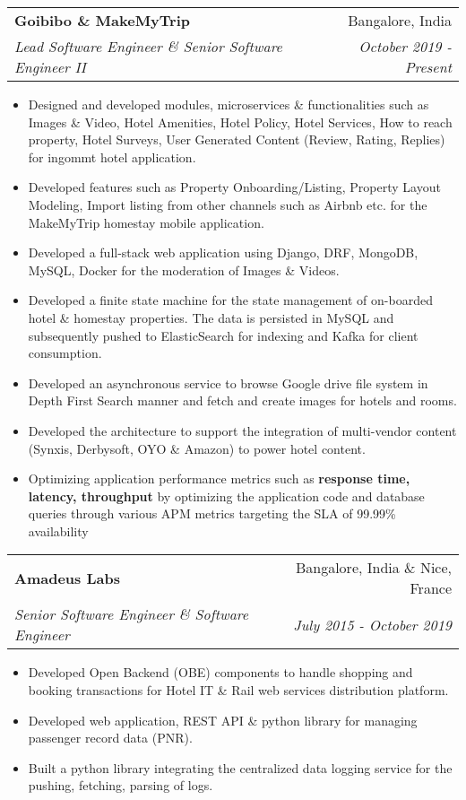 \documentclass[letterpaper,11pt]{article}
\makeatletter
\newcommand{\resumeItem}[1]{
  \item\small{
    {#1 \vspace{-2pt}}
  }
}
\newcommand{\resumeSubheading}[4]{
  \vspace{-2pt}\item
    \begin{tabular*}{0.97\textwidth}[t]{l@{\extracolsep{\fill}}r}
      \textbf{#1} & #2 \\
      \textit{\small#3} & \textit{\small #4} \\
    \end{tabular*}\vspace{-7pt}
}
\newcommand{\resumeSubSubheading}[2]{
    \item
    \begin{tabular*}{0.97\textwidth}{l@{\extracolsep{\fill}}r}
      \textit{\small#1} & \textit{\small #2} \\
    \end{tabular*}\vspace{-7pt}
}
\newcommand{\resumeSubHeadingListEnd}{\end{itemize}}
\newcommand{\resumeItemListStart}{\begin{itemize}}
\newcommand{\resumeItemListEnd}{\end{itemize}\vspace{-5pt}}
\makeatother
\begin{document}
\resumeSubheading
{Goibibo \& MakeMyTrip }{Bangalore, India}
{Lead Software Engineer \& Senior Software Engineer II}{October 2019 - Present}
\resumeItemListStart		
\resumeItem{Designed and developed modules, microservices \& functionalities such as Images \& Video, Hotel Amenities, Hotel Policy, Hotel Services, How to reach property, Hotel Surveys, User Generated Content (Review, Rating, Replies) for ingommt hotel application.}
\resumeItem{Developed features such as Property Onboarding/Listing, Property Layout Modeling, Import listing from other channels such as Airbnb etc. for the MakeMyTrip homestay mobile application.}
\resumeItem{Developed a full-stack web application using Django, DRF, MongoDB, MySQL, Docker for the moderation of Images \& Videos.}
\resumeItem{Developed a finite state machine for the state management of on-boarded hotel \& homestay properties. The data is persisted in MySQL and subsequently pushed to ElasticSearch for indexing and Kafka for client consumption.}
\resumeItem{Developed an asynchronous service to browse Google drive file system in Depth First Search manner and fetch and create images for hotels and rooms.}
\resumeItem{Developed the architecture to support the integration of multi-vendor content (Synxis, Derbysoft, OYO \& Amazon) to power hotel content.}
\resumeItem{Optimizing application performance metrics such as \textbf{response time, latency, throughput} by optimizing the application code and database queries through various APM metrics targeting the SLA of 99.99\% availability}
\resumeItemListEnd
      

\resumeSubheading
{Amadeus Labs}{Bangalore, India \& Nice, France}
{Senior Software Engineer \& Software Engineer}{July 2015 - October 2019}
\resumeItemListStart
\resumeItem{Developed Open Backend (OBE) components to handle shopping and booking transactions for Hotel IT \& Rail web services distribution platform.}
\resumeItem{Developed web application, REST API \& python library for managing passenger record data (PNR).}
\resumeItem{Built a python library integrating the centralized data logging service for the pushing, fetching, parsing of logs.}
\resumeItemListEnd
\end{document}
